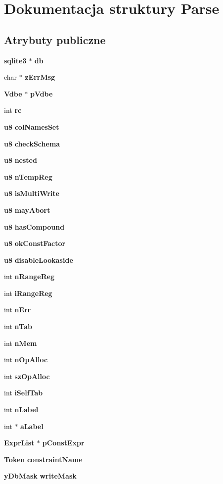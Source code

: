 \section{Dokumentacja struktury Parse}
\label{struct_parse}
\subsection*{Atrybuty publiczne}
\begin{DoxyCompactItemize}
\item 
\textbf{ sqlite3} $\ast$ \textbf{ db}
\item 
char $\ast$ \textbf{ z\+Err\+Msg}
\item 
\textbf{ Vdbe} $\ast$ \textbf{ p\+Vdbe}
\item 
int \textbf{ rc}
\item 
\textbf{ u8} \textbf{ col\+Names\+Set}
\item 
\textbf{ u8} \textbf{ check\+Schema}
\item 
\textbf{ u8} \textbf{ nested}
\item 
\textbf{ u8} \textbf{ n\+Temp\+Reg}
\item 
\textbf{ u8} \textbf{ is\+Multi\+Write}
\item 
\textbf{ u8} \textbf{ may\+Abort}
\item 
\textbf{ u8} \textbf{ has\+Compound}
\item 
\textbf{ u8} \textbf{ ok\+Const\+Factor}
\item 
\textbf{ u8} \textbf{ disable\+Lookaside}
\item 
int \textbf{ n\+Range\+Reg}
\item 
int \textbf{ i\+Range\+Reg}
\item 
int \textbf{ n\+Err}
\item 
int \textbf{ n\+Tab}
\item 
int \textbf{ n\+Mem}
\item 
int \textbf{ n\+Op\+Alloc}
\item 
int \textbf{ sz\+Op\+Alloc}
\item 
int \textbf{ i\+Self\+Tab}
\item 
int \textbf{ n\+Label}
\item 
int $\ast$ \textbf{ a\+Label}
\item 
\textbf{ Expr\+List} $\ast$ \textbf{ p\+Const\+Expr}
\item 
\textbf{ Token} \textbf{ constraint\+Name}
\item 
\textbf{ y\+Db\+Mask} \textbf{ write\+Mask}
\item 

\end{DoxyCompactItemize}
